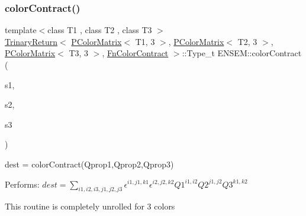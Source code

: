 \subsubsection{\texorpdfstring{colorContract()}{colorContract()}\hspace{0.1cm}{\footnotesize\ttfamily [1/4]}}
{\footnotesize\ttfamily template$<$class T1 , class T2 , class T3 $>$ \\
\mbox{\hyperlink{structENSEM_1_1TrinaryReturn}{Trinary\+Return}}$<$ \mbox{\hyperlink{classENSEM_1_1PColorMatrix}{P\+Color\+Matrix}}$<$ T1, 3 $>$, \mbox{\hyperlink{classENSEM_1_1PColorMatrix}{P\+Color\+Matrix}}$<$ T2, 3 $>$, \mbox{\hyperlink{classENSEM_1_1PColorMatrix}{P\+Color\+Matrix}}$<$ T3, 3 $>$, \mbox{\hyperlink{structENSEM_1_1FnColorContract}{Fn\+Color\+Contract}} $>$\+::Type\+\_\+t E\+N\+S\+E\+M\+::color\+Contract (\begin{DoxyParamCaption}\item[{const \mbox{\hyperlink{classENSEM_1_1PColorMatrix}{P\+Color\+Matrix}}$<$ T1, 3 $>$ \&}]{s1,  }\item[{const \mbox{\hyperlink{classENSEM_1_1PColorMatrix}{P\+Color\+Matrix}}$<$ T2, 3 $>$ \&}]{s2,  }\item[{const \mbox{\hyperlink{classENSEM_1_1PColorMatrix}{P\+Color\+Matrix}}$<$ T3, 3 $>$ \&}]{s3 }\end{DoxyParamCaption})\hspace{0.3cm}{\ttfamily [inline]}}



dest = color\+Contract(\+Qprop1,\+Qprop2,\+Qprop3) 

Performs\+: $dest = \sum_{i1,i2,i3,j1,j2,j3} \epsilon^{i1,j1,k1}\epsilon^{i2,j2,k2} Q1^{i1,i2} Q2^{j1,j2} Q3^{k1,k2}$

This routine is completely unrolled for 3 colors \mbox{\label{group__primcolormatrix_ga89c3eb4b75063bbb9022ef9b699765dd}} 
